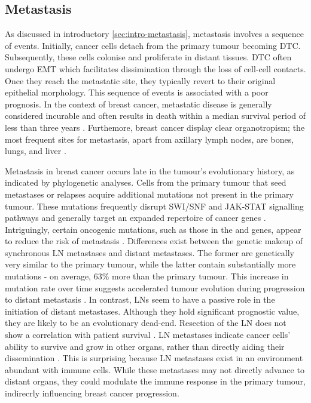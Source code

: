 \subsection{Metastasis}

As discussed in introductory \cref{sec:intro-metastasis}, metastasis involves a sequence of events. Initially, cancer cells detach from the primary tumour becoming \acf{DTC}. Subsequently, these cells colonise and proliferate in distant tissues. \ac{DTC} often undergo \ac{EMT} which facilitates dissimination through the loss of cell-cell contacts. Once they reach the metastatic site, they typically revert to their original epithelial morphology. This sequence of events is associated with a poor prognosis. In the context of breast cancer, metastatic disease is generally considered incurable and often results in death within a median survival period of less than three years \parencite{Harbeck2019-jx}. Furthemore, breast cancer display clear organotropism; the most frequent sites for metastasis, apart from axillary lymph nodes, are bones, lungs, and liver \parencite{Nguyen2022-jr}.

Metastasis in breast cancer occurs late in the tumour's evolutionary history, as indicated by phylogenetic analyses. Cells from the primary tumour that seed metastases or relapses acquire additional mutations not present in the primary tumour. These mutations frequently disrupt SWI/SNF and JAK-STAT signalling pathways and generally target an expanded repertoire of cancer genes \parencite{Yates2017-xc}. Intriguingly, certain oncogenic mutations, such as those in the  and  genes, appear to reduce the risk of metastasis \parencite{Nguyen2022-jr}. 
Differences exist between the genetic makeup of synchronous \acf{LN} metastases and distant metastases. The former are genetically very similar to the primary tumour, while the latter contain substantially more mutations - on average, 63\% more than the primary tumour. This increase in mutation rate over time suggests accelerated tumour evolution during progression to distant metastasis \parencite{Yates2017-xc}. In contrast, \ac{LN}s seem to have a passive role in the initiation of distant metastases. Although they hold significant prognostic value, they are likely to be an evolutionary dead-end. Resection of the \ac{LN} does not show a correlation with patient survival \parencite{Fisher1977-ua}. \ac{LN} metastases indicate cancer cells' ability to survive and grow in other organs, rather than directly aiding their dissemination \parencite{Ullah2018-xe}. This is surprising because \ac{LN} metastases exist in an environment abundant with immune cells. While these metastases may not directly advance to distant organs, they could modulate the immune response in the primary tumour, indirecrly influencing breast cancer progression.

